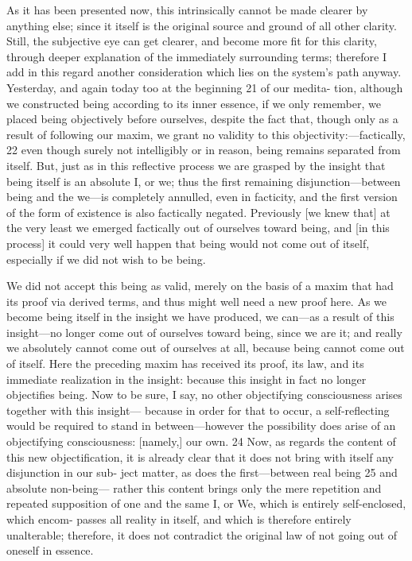 As it has been presented now, this intrinsically cannot be made clearer
by anything else; since it itself is the original source and ground of all other
clarity.
Still, the subjective eye can get clearer, and become more fit for this
clarity, through deeper explanation of the immediately surrounding terms;
therefore I add in this regard another consideration which lies on the system’s
path anyway.
Yesterday, and again today too at the beginning 21 of our medita-
tion, although we constructed being according to its inner essence, if we only
remember, we placed being objectively before ourselves, despite the fact that,
though only as a result of following our maxim, we grant no validity to this
objectivity:—factically, 22 even though surely not intelligibly or in reason, being
remains separated from itself.
But, just as in this reflective process we are
grasped by the insight that being itself is an absolute I, or we; thus the first
remaining disjunction—between being and the we—is completely annulled,
even in facticity, and the first version of the form of existence is also factically
negated.
Previously [we knew that] at the very least we emerged factically out
of ourselves toward being, and [in this process] it could very well happen that
being would not come out of itself, especially if we did not wish to be being.

We did not accept this being as valid, merely on the basis of a maxim that had
its proof via derived terms, and thus might well need a new proof here.
As we
become being itself in the insight we have produced, we can—as a result of
this insight—no longer come out of ourselves toward being, since we are it;
and really we absolutely cannot come out of ourselves at all, because being
cannot come out of itself.
Here the preceding maxim has received its proof,
its law, and its immediate realization in the insight: because this
insight in fact no longer objectifies being.
Now to be sure, I say, no other
objectifying consciousness arises together with this insight— because in
order for that to occur, a self-reflecting would be required to stand in
between—however the possibility does arise of an objectifying consciousness:
[namely,] our own.
24 Now, as regards the content of this new objectification,
it is already clear that it does not bring with itself any disjunction in our sub-
ject matter, as does the first—between real being 25 and absolute non-being—
rather this content brings only the mere repetition and repeated supposition
of one and the same I, or We, which is entirely self-enclosed, which encom-
passes all reality in itself, and which is therefore entirely unalterable; therefore,
it does not contradict the original law of not going out of oneself in essence.

